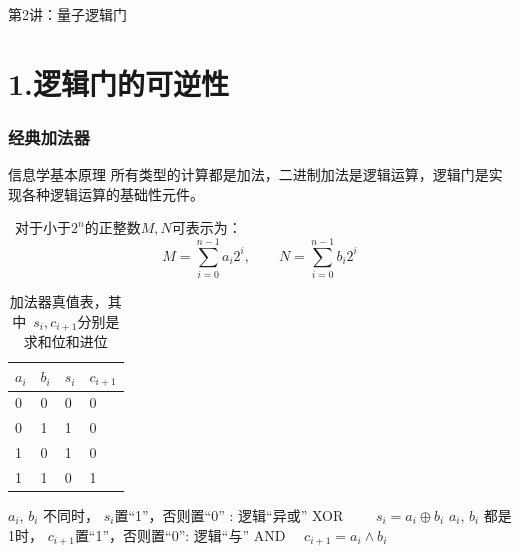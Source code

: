 

\begin{frame} [plain]
    \frametitle{}
    \Background[1] 
    \begin{center}
    {\huge 第2讲：量子逻辑门}
    \end{center}  
    \addtocounter{framenumber}{-1}   
\end{frame}

\section{1.逻辑门的可逆性}

\begin{frame} 
    \frametitle{经典加法器}
    \begin{tcolorbox2}{信息学基本原理}
    所有类型的计算都是加法，二进制加法是逻辑运算，逻辑门是实现各种逻辑运算的基础性元件。
    \end{tcolorbox2}
    \解~对于小于$2^n$的正整数$M,N$可表示为：
    \[M=\sum_{i=0} ^{n-1} a_i 2^i,\qquad N=\sum_{i=0} ^{n-1} b_i 2^i\]
\end{frame} 

\begin{frame}    
    \begin{table}
        \caption{加法器真值表，其中 $s_i, c_{i+1}$分别是求和位和进位}
        \begin{tabular}{@{} llll @{}}
          $a_i$ & $b_i$ & $s_i$ & $c_{i+1}$\\
          \midrule
          0 & 0 & 0 & 0 \\
          0 & 1 & 1 & 0\\
          1 & 0 & 1 & 0\\
          1 & 1 & 0 & 1\\
          \bottomrule
        \end{tabular}
      \end{table}
    \begin{itemize}
        \IItem $a_i$, $b_i$ 不同时， $s_i$置“1”，否则置“0” : 逻辑“异或” XOR  $\qquad s_i=a_i\oplus b_i $
        \IItem $a_i$, $b_i$ 都是1时， $c_{i+1}$置“1”，否则置“0”:   逻辑“与” AND  $\quad c_{i+1}=a_i \wedge b_i $
    \end{itemize}
\end{frame} 

